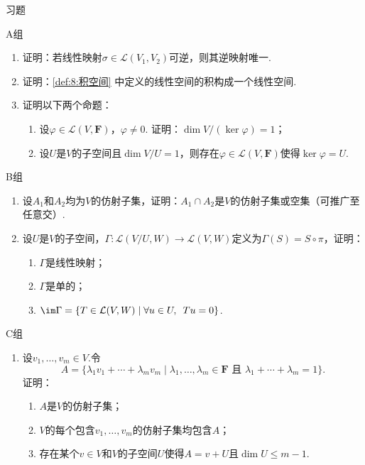 \vspace{2ex}

\centerline{\heiti \Large 习题}
\vspace{2ex}
{\kaishu }
\begin{flushright}
    \kaishu

\end{flushright}
\centerline{\heiti A组}
\begin{enumerate}
    \item 证明：若线性映射$\sigma \in \mathcal{L}(V_1,V_2)$可逆，则其逆映射唯一.
    \item 证明：\autoref{def:8:积空间} 中定义的线性空间的积构成一个线性空间.
    \item 证明以下两个命题：
    \begin{enumerate}[label=(\arabic*)]
        \item 设$\varphi\in \mathcal{L}(V,\mathbf{F})$，$\varphi\neq 0$. 证明：$\dim V/(\ker\varphi)=1$；
        \item 设$U$是$V$的子空间且$\dim V/U=1$，则存在$\varphi\in \mathcal{L}(V,\mathbf{F})$使得$\ker\varphi=U$.
    \end{enumerate}
\end{enumerate}
\centerline{\heiti B组}
\begin{enumerate}
    \item 设$A_1$和$A_2$均为$V$的仿射子集，证明：$A_1\cap A_2$是$V$的仿射子集或空集（可推广至任意交）.
    \item 设$U$是$V$的子空间，$\Gamma:\mathcal{L}(V/U,W)\to \mathcal{L}(V,W)$定义为$\Gamma(S)=S\circ\pi$，证明：
    \begin{enumerate}[label=(\arabic*)]
        \item $\Gamma$是线性映射；
        \item $\Gamma$是单的；
        \item $\im\Gamma=\{T\in \mathcal{L}(V,W) \mid \forall u\in U,\enspace Tu=0\}$.
    \end{enumerate}
\end{enumerate}
\centerline{\heiti C组}
\begin{enumerate}
    \item 设$v_1,\ldots,v_m\in V$.令
    \[A=\{\lambda_1v_1+\cdots+\lambda_mv_m \mid \lambda_1,\ldots,\lambda_m\in\mathbf{F}\text{~且~}\lambda_1+\cdots+\lambda_m=1\}.\]
    证明：
    \begin{enumerate}[label=(\arabic*)]
        \item $A$是$V$的仿射子集；
        \item $V$的每个包含$v_1,\ldots,v_m$的仿射子集均包含$A$；
        \item 存在某个$v\in V$和$V$的子空间$U$使得$A=v+U$且$\dim U\le m-1$.
    \end{enumerate}
\end{enumerate}
